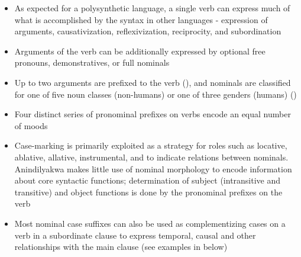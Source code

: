 \documentclass[output=paper]{langscibook}
\begin{document}
\begin{itemize}
\item As expected for a polysynthetic language, a single verb can express much of what is accomplished by the syntax in other languages - expression of arguments, causativization, reflexivization, reciprocity, and subordination

\item Arguments of the verb can be additionally expressed by optional free pronouns, demonstratives, or full nominals

\item Up to two arguments are prefixed to the verb (), and nominals are classified for one of five noun classes (non-humans) or one of three genders (humans) ()

\item Four distinct series of pronominal prefixes on verbs encode an equal number of moods

\item Case-marking is primarily exploited as a strategy for roles such as locative, ablative, allative, instrumental, and to indicate relations between nominals. Anindilyakwa makes little use of nominal morphology to encode information about core syntactic functions; determination of subject (intransitive and transitive) and object functions is done by the pronominal prefixes on the verb

\item Most nominal case suffixes can also be used as complementizing cases on a verb in a subordinate clause to express temporal, causal and other relationships with the main clause (see examples in  below)

\end{itemize}
\end{document}
